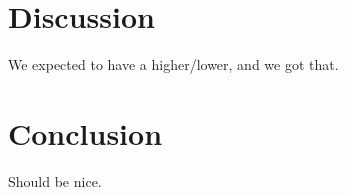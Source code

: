 \documentclass[../main/main.tex]{subfiles}
\begin{document}
\section{Discussion}\label{sec:simdisc}
We expected to have a higher/lower, and we got that.

\section{Conclusion}\label{sec:simccl}

Should be nice.


\clearpage

\thispagestyle{plain}
\vfill
\minilof
\vfill
\minilot
\vfill


\shorthandoff{:}

\end{document}

